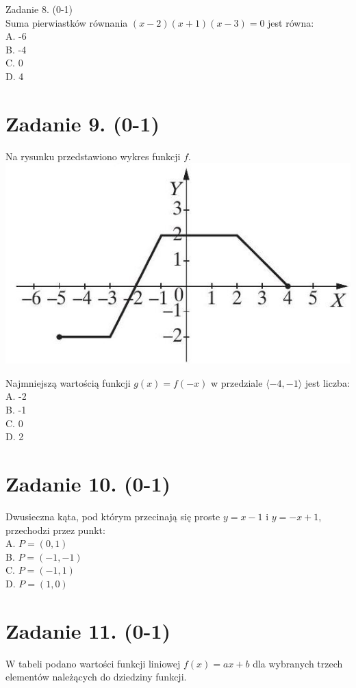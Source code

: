 \documentclass[10pt]{article}
\begin{document}
Zadanie 8. (0-1)\\
Suma pierwiastków równania \((x-2)(x+1)(x-3)=0\) jest równa:\\
A. -6\\
B. -4\\
C. 0\\
D. 4

\section*{Zadanie 9. (0-1)}
Na rysunku przedstawiono wykres funkcji \(f\).\\
\includegraphics[max width=\textwidth, center]{2024_11_21_99eb8e6624b497a5af43g-04}

Najmniejszą wartością funkcji \(g(x)=f(-x)\) w przedziale \(\langle-4,-1\rangle\) jest liczba:\\
A. -2\\
B. -1\\
C. 0\\
D. 2

\section*{Zadanie 10. (0-1)}
Dwusieczna kąta, pod którym przecinają się proste \(y=x-1\) i \(y=-x+1\), przechodzi przez punkt:\\
A. \(P=(0,1)\)\\
B. \(P=(-1,-1)\)\\
C. \(P=(-1,1)\)\\
D. \(P=(1,0)\)

\section*{Zadanie 11. (0-1)}
W tabeli podano wartości funkcji liniowej \(f(x)=a x+b\) dla wybranych trzech elementów należących do dziedziny funkcji.
\end{document}
